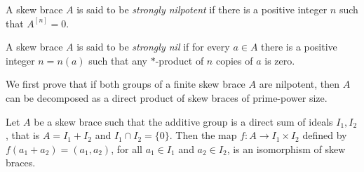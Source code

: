 

\begin{definition}
A skew brace $A$ is said to be \emph{strongly nilpotent}
if there is a positive integer $n$ such that $A^{[n]}=0$.
\end{definition}

\begin{definition}
    A skew brace $A$ is said to be \emph{strongly nil} if for every
    $a\in A$ there is a positive integer $n=n(a)$ such that any $*$-product of
    $n$ copies of $a$ is zero.
\end{definition}


%
%

We first prove that if both groups of a finite skew brace $A$ are
nilpotent, then $A$ can be decomposed as a direct product of skew braces
of prime-power size. 

\begin{lemma}
\label{sum}
    Let $A$ be a skew brace such that the additive
group is a direct sum of ideals $I_1,I_2$, that is $A=I_1+I_2$ and
$I_1\cap I_2=\{0\}$. Then the map $f:A\rightarrow I_1\times I_2$
defined by $f(a_1+a_2)=(a_1,a_2)$, for all $a_1\in I_1$ and $a_2\in
I_2$, is an isomorphism of skew braces.
\end{lemma}

